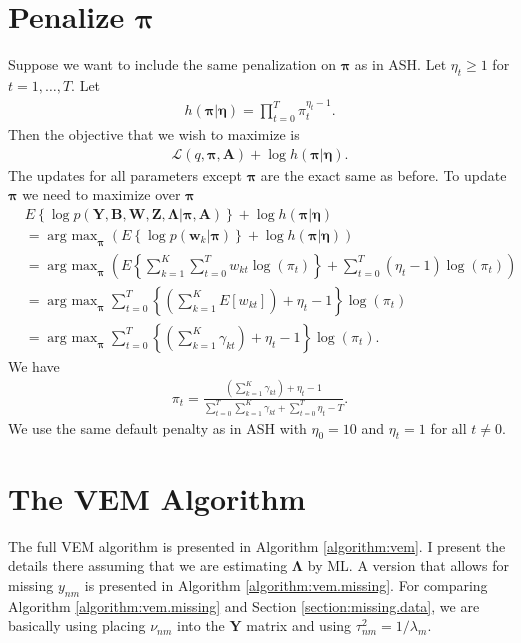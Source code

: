 \documentclass[11pt,authoryear]{article}
\DeclareMathOperator*{\argmax}{arg\ max}
\newcommand{\bs}[1]{\boldsymbol{#1}}
\begin{document}
\section{Penalize $\bs{\pi}$}
Suppose we want to include the same penalization on $\bs{\pi}$ as in
ASH. Let $\eta_t \geq 1$ for $t = 1,\ldots, T$. Let
\begin{align}
h(\bs{\pi}|\bs{\eta}) = \prod_{t = 0}^T \pi_t^{\eta_t - 1}.
\end{align}
Then the objective that we wish to maximize is
\begin{align}
\mathcal{L}(q, \bs{\pi}, \bs{A}) + \log h(\bs{\pi}|\bs{\eta}).
\end{align}
The updates for all parameters except $\bs{\pi}$ are the exact same as before. To update $\bs{\pi}$ we need to maximize over $\bs{\pi}$
\begin{align}
&E\left\{\log p(\bs{Y},\bs{B},\bs{W},\bs{Z},\bs{\Lambda}|\bs{\pi},\bs{A})\right\} + \log h(\bs{\pi}|\bs{\eta})\\
&= \argmax_{\bs{\pi}}\left( E\left\{\log p(\bs{w}_k|\bs{\pi})\right\} + \log h(\bs{\pi}|\bs{\eta})\right)\\
&= \argmax_{\bs{\pi}} \left(E\left\{\sum_{k = 1}^K\sum_{t = 0}^Tw_{kt}\log(\pi_t)\right\} + \sum_{t = 0}^T (\eta_t - 1)\log(\pi_t)\right)\\
&= \argmax_{\bs{\pi}} \sum_{t = 0}^T\left\{\left(\sum_{k = 1}^KE[w_{kt}]\right) + \eta_t - 1 \right\}\log(\pi_t)\\
&= \argmax_{\bs{\pi}} \sum_{t = 0}^T\left\{\left(\sum_{k = 1}^K\gamma_{kt}\right) + \eta_t - 1 \right\}\log(\pi_t).
\end{align}
We have
\begin{align}
\pi_t = \frac{\left(\sum_{k = 1}^K\gamma_{kt}\right) + \eta_t - 1}{\sum_{t = 0}^T\sum_{k = 1}^K\gamma_{kt} + \sum_{t = 0}^T\eta_t - T}.
\end{align}
We use the same default penalty as in ASH with $\eta_0 = 10$ and $\eta_t = 1$ for all $t \neq 0$.


\section{The VEM Algorithm}
The full VEM algorithm is presented in Algorithm
\ref{algorithm:vem}. I present the details there assuming that we are
estimating $\bs{\Lambda}$ by ML. A version that allows for missing
$y_{nm}$ is presented in Algorithm \ref{algorithm:vem.missing}. For
comparing Algorithm \ref{algorithm:vem.missing} and Section
\ref{section:missing.data}, we are basically using placing $\nu_{nm}$
into the $\bs{Y}$ matrix and using $\tau_{nm}^2 = 1 / \lambda_m$.
\end{document}
